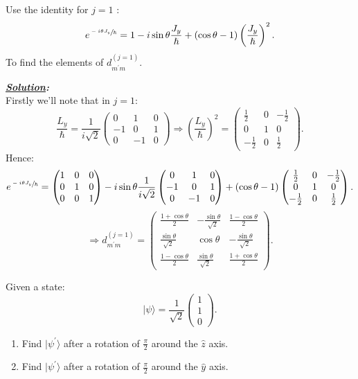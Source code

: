 \documentclass[notitlepage]{report}
\begin{document}
\newpage
\begin{question}[title = Question 4]{}{}
Use the identity for $j=1$ :\\
\[
	e^{\sfrac{-i\theta J_y}{\hslash}}=1-i\sin \theta \frac{J_y}{\hslash}+\left(\cos \theta -1\right)\left(\frac{J_y}{\hslash}\right)^2  
.\] 
To find the elements of $d^{\left(j=1\right) }_{m^\prime m}$.
\end{question}
\textbf{\emph{\underline{Solution}:}}\\
Firstly we'll note that in $j=1$:\\
\[
	\frac{L_y}{\hslash}=\frac{1}{i\sqrt{2} }
\begin{pmatrix}
	0 & 1 & 0\\
	-1 & 0 & 1\\
	0 & -1 & 0
\end{pmatrix}
\Rightarrow \left(\frac{L_y}{\hslash}\right)^2=
\begin{pmatrix}
	\frac{1}{2} & 0 & -\frac{1}{2}\\
	0 & 1 & 0\\
	-\frac{1}{2} & 0 & \frac{1}{2}
\end{pmatrix}
.\] 
Hence:\\
\[
	e^{\sfrac{-i\theta J_y}{\hslash}}=
\begin{pmatrix}
	1 & 0 & 0\\
	0 & 1 & 0\\
	0 & 0 & 1
\end{pmatrix}
-i\sin \theta \frac{1}{i\sqrt{2} }
\begin{pmatrix}
	0 & 1 & 0\\
	-1 & 0 & 1\\
	0 & -1 & 0
\end{pmatrix}+\left(\cos \theta -1\right)  
\begin{pmatrix}
	\frac{1}{2} & 0 & -\frac{1}{2}\\
	0 & 1 & 0\\
	-\frac{1}{2} & 0 & \frac{1}{2}
\end{pmatrix}
.\] 
\[
	\Rightarrow \boxed{d^{\left(j=1\right) }_{m^\prime m}=
\begin{pmatrix}
	\frac{1 +\cos \theta}{2} & -\frac{\sin\theta}{\sqrt{2} } & \frac{1-\cos\theta}{2}\\
	\frac{\sin\theta}{\sqrt{2} }&\cos\theta &-\frac{\sin\theta}{\sqrt{2} } \\
	\frac{1-\cos\theta}{2}&\frac{\sin\theta}{\sqrt{2} } &\frac{1+\cos \theta}{2} 
\end{pmatrix}}
.\] 
\begin{question}[title = Question 5]{}{}
Given a state:\\
\[
	|\psi\rangle=\frac{1}{\sqrt{2} }
	\begin{pmatrix}
		1\\
		1\\
		0
	\end{pmatrix}
.\] 
\begin{enumerate}[label=\alph*)]
	\item Find $|\psi^\prime\rangle $ after a rotation of $\frac{\pi}{2}$ around the $\hat{z}$ axis.
	\item Find $|\psi^\prime\rangle $ after a rotation of $\frac{\pi}{2}$ around the $\hat{y}$ axis.
\end{enumerate}
\end{question}
\end{document}
